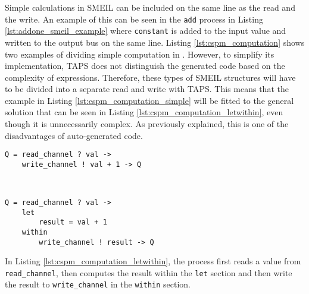 Simple calculations in SMEIL can be included on the same line as the read and the write. An example of this can be seen in the \texttt{add} process in Listing \ref{lst:addone_smeil_example} where \texttt{constant} is added to the input value and written to the output bus on the same line.
Listing \ref{lst:cspm_computation} shows two examples of dividing simple computation in \cspm{}. However, to simplify its implementation, TAPS does not distinguish the generated code based on the complexity of expressions.
Therefore, these types of SMEIL structures will have to be divided into a separate read and write with TAPS.
This means that the example in Listing \ref{lst:cspm_computation_simple} will be fitted to the general solution that can be seen in Listing \ref{lst:cspm_computation_letwithin}, even though it is unnecessarily complex. As previously explained, this is one of the disadvantages of auto-generated code.\\
\begin{minipage}[t]{.98\linewidth}
    \centering
\begin{minipage}[t]{0.45\linewidth}
\begin{verbatim}
Q = read_channel ? val ->
    write_channel ! val + 1 -> Q



\end{verbatim}
  \label{lst:cspm_computation_simple}
\end{minipage}
\hspace{0.6cm}
\begin{minipage}[t]{0.45\linewidth}
\begin{verbatim}
Q = read_channel ? val ->
    let
        result = val + 1
    within
        write_channel ! result -> Q
\end{verbatim}
\label{lst:cspm_computation_letwithin}
\end{minipage}
\vspace{0.3cm}
\label{lst:cspm_computation}
\vspace{1cm}
\end{minipage}

In Listing \ref{lst:cspm_computation_letwithin}, the process first reads a value from \texttt{read\_channel}, then computes the result within the \texttt{let} section and then write the result to \texttt{write\_channel} in the \texttt{within} section.
